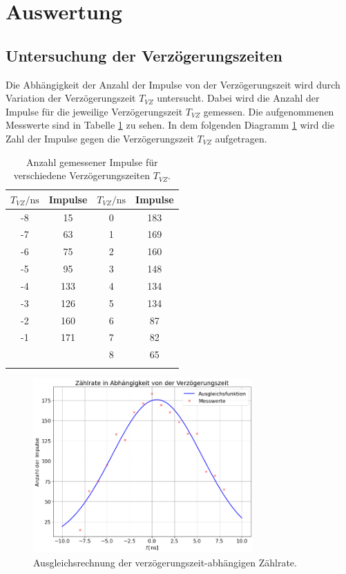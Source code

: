 \section{Auswertung}
\label{sec:Auswertung} 
\subsection{Untersuchung der Verzögerungszeiten}
\label{subsec:1}

Die Abhängigkeit der Anzahl der Impulse von der Verzögerungszeit wird durch Variation der Verzögerungszeit $T_{VZ}$ untersucht. Dabei wird die Anzahl der Impulse für die jeweilige Verzögerungszeit $T_{VZ}$ gemessen. Die aufgenommenen Messwerte sind in Tabelle \ref{tab:table1} zu sehen. In dem folgenden Diagramm \ref{fig:plot1} wird die Zahl der Impulse gegen die Verzögerungszeit $T_{VZ}$ aufgetragen. 

\begin{table}[H]
\centering
\caption{Anzahl gemessener Impulse für verschiedene Verzögerungszeiten $T_{VZ}$.}
\begin{tabular}{c|c||c|c}
$T_{VZ}/\mathrm{ns}$ & Impulse & $T_{VZ}/\mathrm{ns}$ & Impulse\\
\hline
-8	&   15 & 0 & 183\\
-7	&	63 & 1 & 169\\
-6	&	75 & 2 & 160\\
-5	&	95 & 3 & 148\\
-4	&	133& 4 & 134\\
-3	&	126& 5 & 134\\
-2	&	160& 6 &  87\\
-1	&	171& 7 &  82\\
 	&	   & 8 &  65\\
\label{tab:table1}
\end{tabular}
\end{table}

\begin{figure}[H]
 \centering
 \includegraphics[width=0.75\textwidth]{plot1.png}
 \caption{Ausgleichsrechnung der verzögerungszeit-abhängigen Zählrate.}
 \label{fig:plot1}
\end{figure}

